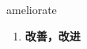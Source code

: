 
\begin{frame}
{\huge ameliorate}
\begin{center}
\begin{enumerate}\Large
  \item \textbf{改善，改进}
\end{enumerate}
\end{center}
\end{frame}
